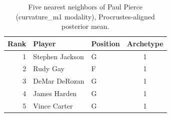 \begin{table}[htbp]
  \centering\small
  \begin{tabular}{rllc}
    \toprule
    Rank & Player & Position & Archetype \\
    \midrule
    1 & Stephen Jackson & G & 1 \\
    2 & Rudy Gay & F & 1 \\
    3 & DeMar DeRozan & G & 1 \\
    4 & James Harden & G & 1 \\
    5 & Vince Carter & G & 1 \\
    \bottomrule
  \end{tabular}
  \caption{Five nearest neighbors of Paul Pierce (curvature_m1 modality), Procrustes-aligned posterior mean.}
  \label{tab:Paul_Pierce_neighbors_curvature_m1}
\end{table}

